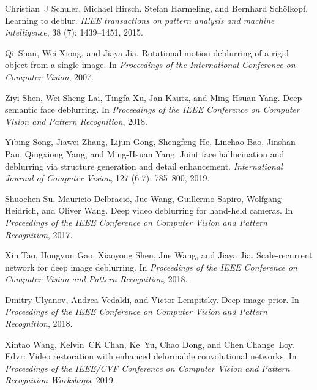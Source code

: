 \documentclass[final]{cvpr}
\begin{document}
{\begin{thebibliography}{43}
Christian~J Schuler, Michael Hirsch, Stefan Harmeling, and Bernhard
  Sch{\"o}lkopf.
\newblock Learning to deblur.
\newblock \emph{IEEE transactions on pattern analysis and machine
  intelligence}, 38 (7): 1439--1451, 2015.

Qi~Shan, Wei Xiong, and Jiaya Jia.
\newblock Rotational motion deblurring of a rigid object from a single image.
\newblock In \emph{Proceedings of the International Conference on Computer
  Vision}, 2007.

Ziyi Shen, Wei-Sheng Lai, Tingfa Xu, Jan Kautz, and Ming-Hsuan Yang.
\newblock Deep semantic face deblurring.
\newblock In \emph{Proceedings of the {IEEE} Conference on Computer Vision and
  Pattern Recognition}, 2018.

Yibing Song, Jiawei Zhang, Lijun Gong, Shengfeng He, Linchao Bao, Jinshan Pan,
  Qingxiong Yang, and Ming-Hsuan Yang.
\newblock Joint face hallucination and deblurring via structure generation and
  detail enhancement.
\newblock \emph{International Journal of Computer Vision}, 127
  (6-7): 785--800, 2019.

Shuochen Su, Mauricio Delbracio, Jue Wang, Guillermo Sapiro, Wolfgang Heidrich,
  and Oliver Wang.
\newblock Deep video deblurring for hand-held cameras.
\newblock In \emph{Proceedings of the {IEEE} Conference on Computer Vision and
  Pattern Recognition}, 2017.

Xin Tao, Hongyun Gao, Xiaoyong Shen, Jue Wang, and Jiaya Jia.
\newblock Scale-recurrent network for deep image deblurring.
\newblock In \emph{Proceedings of the {IEEE} Conference on Computer Vision and
  Pattern Recognition}, 2018.

Dmitry Ulyanov, Andrea Vedaldi, and Victor Lempitsky.
\newblock Deep image prior.
\newblock In \emph{Proceedings of the {IEEE} Conference on Computer Vision and
  Pattern Recognition}, 2018.

Xintao Wang, Kelvin~CK Chan, Ke~Yu, Chao Dong, and Chen Change~Loy.
\newblock Edvr: Video restoration with enhanced deformable convolutional
  networks.
\newblock In \emph{Proceedings of the IEEE/CVF Conference on Computer Vision
  and Pattern Recognition Workshops}, 2019.


\end{thebibliography}}
\end{document}
